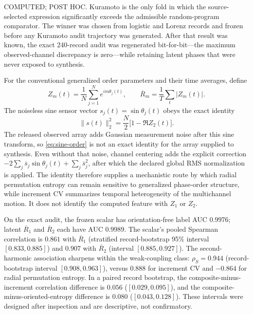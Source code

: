 \documentclass[10pt]{article}
\theoremstyle{definition}
\theoremstyle{remark}
\newcommand{\status}[1]{\textsf{\small #1}}
\begin{document}
\status{COMPUTED; POST HOC}. Kuramoto is the only fold in which the source-selected expression significantly exceeds the admissible random-program comparator. The winner was chosen from logistic and Lorenz records and frozen before any Kuramoto audit trajectory was generated. After that result was known, the exact 240-record audit was regenerated bit-for-bit---the maximum observed-channel discrepancy is zero---while retaining latent phases that were never exposed to synthesis.

For the conventional generalized order parameters and their time averages, define \citep{Daido1992}
\begin{equation}
  Z_m(t)=\frac{1}{N}\sum_{j=1}^{N}e^{im\theta_j(t)},
  \qquad
  \overline R_m=\frac{1}{T}\sum_t |Z_m(t)|.
  \label{eq:kuramoto-order}
\end{equation}
The noiseless sine sensor vector $s_j(t)=\sin\theta_j(t)$ obeys the exact identity
\begin{equation}
  \|s(t)\|_2^2=\frac{N}{2}\bigl[1-\Re Z_2(t)\bigr].
  \label{eq:sine-order}
\end{equation}
The released observed array adds Gaussian measurement noise after this sine transform, so \cref{eq:sine-order} is not an exact identity for the array supplied to synthesis. Even without that noise, channel centering adds the explicit correction $-2\sum_j\bar s_j\sin\theta_j(t)+\sum_j\bar s_j^2$, after which the declared global RMS normalization is applied. The identity therefore supplies a mechanistic route by which radial permutation entropy can remain sensitive to generalized phase-order structure, while increment CV summarizes temporal heterogeneity of the multichannel motion. It does not identify the computed feature with $Z_1$ or $Z_2$.

On the exact audit, the frozen scalar has orientation-free label AUC $0.9976$; latent $\overline R_1$ and $\overline R_2$ each have AUC $0.9989$. The scalar's pooled Spearman correlation is $0.861$ with $\overline R_1$ (stratified record-bootstrap 95\% interval $[0.833,0.885]$) and $0.907$ with $\overline R_2$ (interval $[0.885,0.927]$). The second-harmonic association sharpens within the weak-coupling class: $\rho_S=0.944$ (record-bootstrap interval $[0.908,0.963]$), versus $0.888$ for increment CV and $-0.864$ for radial permutation entropy. In a paired record bootstrap, the composite-minus-increment correlation difference is $0.056$ ($[0.029,0.095]$), and the composite-minus-oriented-entropy difference is $0.080$ ($[0.043,0.128]$). These intervals were designed after inspection and are descriptive, not confirmatory.
\end{document}
